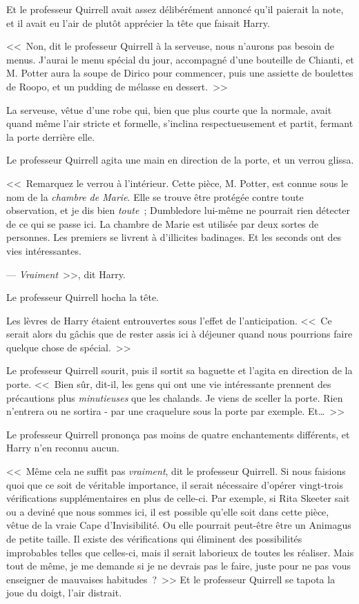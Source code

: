 Et le professeur Quirrell avait assez délibérément annoncé qu'il paierait la note, et il avait eu l'air de plutôt apprécier la tête que faisait Harry.

<<~Non, dit le professeur Quirrell à la serveuse, nous n'aurons pas besoin de menus. J'aurai le menu spécial du jour, accompagné d'une bouteille de Chianti, et M. Potter aura la soupe de Dirico pour commencer, puis une assiette de boulettes de Roopo, et un pudding de mélasse en dessert.~>>

La serveuse, vêtue d’une robe qui, bien que plus courte que la normale, avait quand même l'air stricte et formelle, s'inclina respectueusement et partit, fermant la porte derrière elle.

Le professeur Quirrell agita une main en direction de la porte, et un verrou glissa.

<<~Remarquez le verrou à l'intérieur. Cette pièce, M. Potter, est connue sous le nom de la \emph{chambre de Marie}. Elle se trouve être protégée contre toute observation, et je dis bien \emph{toute}~; Dumbledore lui-même ne pourrait rien détecter de ce qui se passe ici. La chambre de Marie est utilisée par deux sortes de personnes. Les premiers se livrent à d'illicites badinages. Et les seconds ont des vies intéressantes.

--- \emph{Vraiment}~>>, dit Harry.

Le professeur Quirrell hocha la tête.

Les lèvres de Harry étaient entrouvertes sous l'effet de l'anticipation. <<~Ce serait alors du gâchis que de rester assis ici à déjeuner quand nous pourrions faire quelque chose de spécial.~>>

Le professeur Quirrell sourit, puis il sortit sa baguette et l'agita en direction de la porte. <<~Bien sûr, dit-il, les gens qui ont une vie intéressante prennent des précautions plus \emph{minutieuses} que les chalands. Je viens de sceller la porte. Rien n'entrera ou ne sortira - par une craquelure sous la porte par exemple. Et…~>>

Le professeur Quirrell prononça pas moins de quatre enchantements différents, et Harry n'en reconnu aucun.

<<~Même cela ne suffit pas \emph{vraiment}, dit le professeur Quirrell. Si nous faisions quoi que ce soit de véritable importance, il serait nécessaire d'opérer vingt-trois vérifications supplémentaires en plus de celle-ci. Par exemple, si Rita Skeeter sait ou a deviné que nous sommes ici, il est possible qu'elle soit dans cette pièce, vêtue de la vraie Cape d'Invisibilité. Ou elle pourrait peut-être être un Animagus de petite taille. Il existe des vérifications qui éliminent des possibilités improbables telles que celles-ci, mais il serait laborieux de toutes les réaliser. Mais tout de même, je me demande si je ne devrais pas le faire, juste pour ne pas vous enseigner de mauvaises habitudes~?~>> Et le professeur Quirrell se tapota la joue du doigt, l'air distrait.


